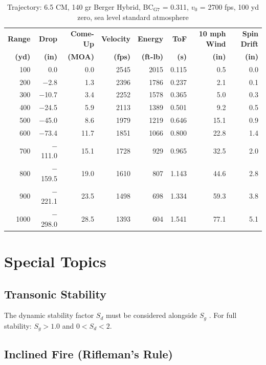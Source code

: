 \documentclass[11pt,twoside,openright]{report}
\begin{document}
\begin{table}[H]
\centering
\caption{Trajectory: 6.5 CM, 140 gr Berger Hybrid, BC$_{\text{G7}}$ = 0.311, $v_0$ = 2700 fps, 100 yd zero, sea level standard atmosphere}
\label{tab:drop_65cm}
\small
\begin{tabular}{@{}rrrrrrrr@{}}
\toprule
\textbf{Range} & \textbf{Drop} & \textbf{Come-Up} & \textbf{Velocity} & \textbf{Energy} & \textbf{ToF} & \textbf{10 mph Wind} & \textbf{Spin Drift} \\
\textbf{(yd)} & \textbf{(in)} & \textbf{(MOA)} & \textbf{(fps)} & \textbf{(ft-lb)} & \textbf{(s)} & \textbf{(in)} & \textbf{(in)} \\
\midrule
100 & 0.0 & 0.0 & 2545 & 2015 & 0.115 & 0.5 & 0.0 \\
200 & $-$2.8 & 1.3 & 2396 & 1786 & 0.237 & 2.1 & 0.1 \\
300 & $-$10.7 & 3.4 & 2252 & 1578 & 0.365 & 5.0 & 0.3 \\
400 & $-$24.5 & 5.9 & 2113 & 1389 & 0.501 & 9.2 & 0.5 \\
500 & $-$45.0 & 8.6 & 1979 & 1219 & 0.646 & 15.1 & 0.9 \\
600 & $-$73.4 & 11.7 & 1851 & 1066 & 0.800 & 22.8 & 1.4 \\
700 & $-$111.0 & 15.1 & 1728 & 929 & 0.965 & 32.5 & 2.0 \\
800 & $-$159.5 & 19.0 & 1610 & 807 & 1.143 & 44.6 & 2.8 \\
900 & $-$221.1 & 23.5 & 1498 & 698 & 1.334 & 59.3 & 3.8 \\
1000 & $-$298.0 & 28.5 & 1393 & 604 & 1.541 & 77.1 & 5.1 \\
\bottomrule
\end{tabular}
\end{table}


\chapter{Special Topics}
\label{ch:special}

\section{Transonic Stability}

The dynamic stability factor $S_d$ must be considered alongside $S_g$ \citep{mccoy1999modern}. For full stability: $S_g > 1.0$ and $0 < S_d < 2$.

\section{Inclined Fire (Rifleman's Rule)}
\end{document}
